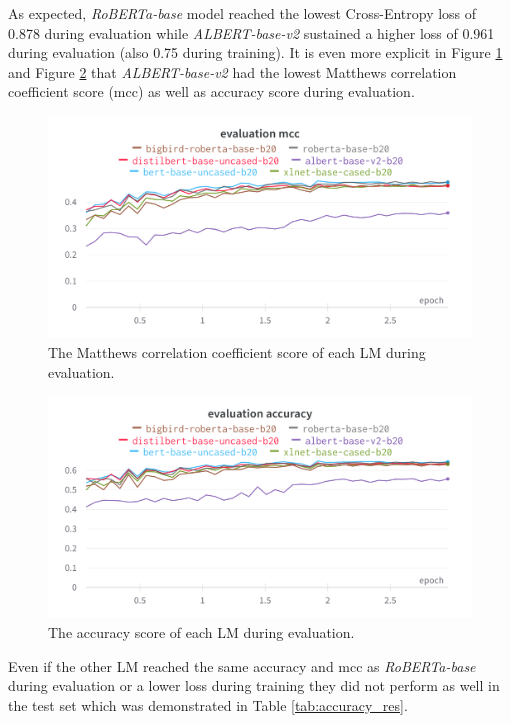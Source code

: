 \documentclass[conference]{IEEEtran}
\begin{document}
As expected, \textit{RoBERTa-base} model reached the lowest Cross-Entropy loss of 0.878 during evaluation while \textit{ALBERT-base-v2} sustained a higher loss of 0.961 during evaluation (also 0.75 during training). It is even more explicit in Figure \ref{fig:eval_mcc} and Figure \ref{fig:eval_acc} that \textit{ALBERT-base-v2} had the lowest Matthews correlation coefficient score (mcc) as well as accuracy score during evaluation.

\begin{figure}[htp]
    \centering
    \includegraphics[scale=0.13]{eval_mcc.png}
    \caption[Comparison]{The Matthews correlation coefficient score of each LM during evaluation.}
    \label{fig:eval_mcc}
\end{figure}

\begin{figure}[htp]
    \centering
    \includegraphics[scale=0.13]{eval_acc.png}
    \caption[Comparison]{The accuracy score of each LM during evaluation.}
    \label{fig:eval_acc}
\end{figure}

Even if the other LM reached the same accuracy and mcc as \textit{RoBERTa-base} during evaluation or a lower loss during training they did not perform as well in the test set which was demonstrated in Table \ref{tab:accuracy_res}.\\
\end{document}

